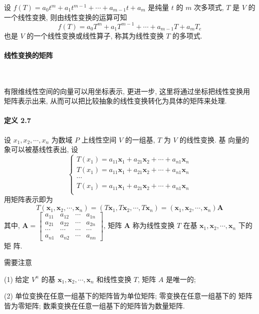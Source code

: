 \par 设 $f(T) = a_0t^m + a_1t^{m-1} + \cdots + a_{m-1}t + a_m$ 是纯量 $t$ 的 $m$ 次多项式, $T$ 是 $V$ 的一个线性变换, 则由线性变换的运算可知
$$
    f(T) = a_0T^m + a_1T^{m-1} + \cdots + a_{m-1}T + a_mT_e
$$
也是 $V$ 的一个线性变换或线性算子, 称其为线性变换 $T$ 的多项式.

\paragraph[]{线性变换的矩阵} \

\par 有限维线性空间的向量可以用坐标表示, 更进一步, 这里将通过坐标把线性变换用
矩阵表示出来, 从而可以把比较抽象的线性变换转化为具体的矩阵来处理.

\paragraph*{定义 2.7} 设 $x_1, x_2, \cdots, x_n$ 为数域 $P$ 上线性空间 $V$ 的一组基, $T$ 为 $V$ 的线性变换. 基
向量的象可以被基线性表出, 设
$$
    \begin{cases}
        T(x_1) = a_{11}\bm{x}_1 + a_{21}\bm{x}_2 + \cdots + a_{n1}\bm{x}_n \\
        T(x_1) = a_{11}\bm{x}_1 + a_{21}\bm{x}_2 + \cdots + a_{n1}\bm{x}_n \\
        \cdots                                                             \\
        T(x_1) = a_{11}\bm{x}_1 + a_{21}\bm{x}_2 + \cdots + a_{n1}\bm{x}_n \\
    \end{cases}
$$
用矩阵表示即为
$$
    T(\bm{x}_1, \bm{x}_2, \cdots, \bm{x}_n) = (T\bm{x}_1, T\bm{x}_2, \cdots, T\bm{x}_n) = (\bm{x}_1, \bm{x}_2, \cdots, \bm{x}_n)\bm{A}
$$
其中, $\bm{A} = \begin{bmatrix}
        a_{11} & a_{12} & \cdots & a_{1n} \\
        a_{21} & a_{22} & \cdots & a_{2n} \\
        \cdots & \cdots & \cdots & \cdots \\
        a_{n1} & a_{n2} & \cdots & a_{nn}
    \end{bmatrix}$, 矩阵 $\bm{A}$ 称为线性变换 $T$ 在基 $\bm{x}_1, \bm{x}_2, \cdots, \bm{x}_n$ 下的矩
阵.

\par 需要注意
\par (1) 给定 $V^n$ 的基 $\bm{x}_1, \bm{x}_2, \cdots, \bm{x}_n$ 和线性变换 $T$, 矩阵 $A$ 是唯一的;
\par (2) 单位变换在任意一组基下的矩阵皆为单位矩阵; 零变换在任意一组基下的
矩阵皆为零矩阵; 数乘变换在任意一组基下的矩阵皆为数量矩阵.

